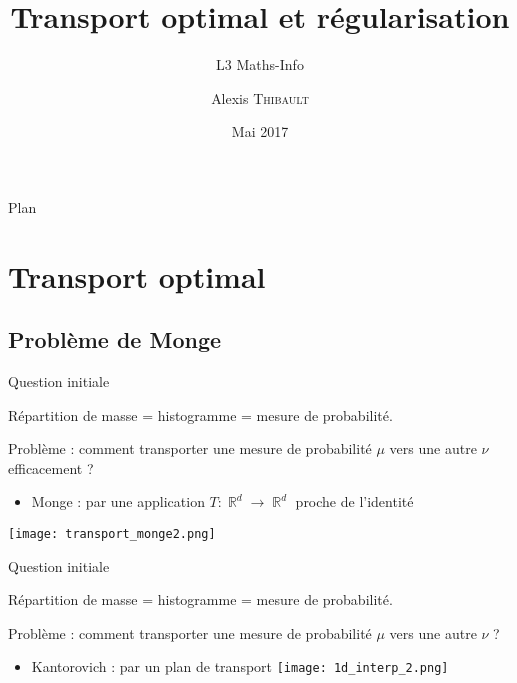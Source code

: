\documentclass{beamer}
\title{Transport optimal et régularisation}
\subtitle{L3 Maths-Info}
\author{Alexis \textsc{Thibault}}
\institute{ENS}
\date{Mai 2017}
\DeclareMathOperator{\IR}{\mathbb{R}}
\begin{document}
\begin{frame}
  \titlepage
\end{frame}

\begin{frame}{Plan}
  \tableofcontents
\end{frame}





\section{Transport optimal}

\subsection{Problème de Monge}

\begin{frame}{Question initiale}

	Répartition de masse = histogramme = mesure de probabilité.
	
    Problème : comment transporter une mesure de probabilité $\mu$ vers une autre $\nu$ efficacement ?
	\pause
    \begin{itemize}
    \item Monge : par une application 
    $ T :     \IR^d     \rightarrow     \IR^d $ \og proche \fg de l'identité
    \end{itemize}
    \begin{center}\texttt{[image: transport\_monge2.png]}\end{center}
    
\end{frame}

\begin{frame}{Question initiale}

	Répartition de masse = histogramme = mesure de probabilité.
	
    Problème : comment transporter une mesure de probabilité $\mu$ vers une autre $\nu$ ?
    \begin{itemize}
    \item Kantorovich : par un plan de transport
    \texttt{[image: 1d\_interp\_2.png]}
    \end{itemize}
    
\end{frame}
\end{document}
